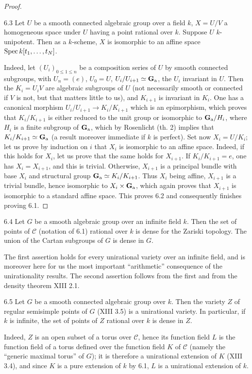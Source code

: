 \begin{proof}
\begin{lemma}{6.3}\label{XIV.6.3}
Let $U$ be a smooth connected
algebraic group over a field
$k$, $X=U/V$ a homogeneous
space under $U$ having a
point rational over $k$.
Suppose $U$ $k$-unipotent.
Then as a $k$-scheme, $X$
is isomorphic to an affine
space $\operatorname{Spec} k[t_1,\ldots,t_N]$.
\end{lemma}
Indeed, let $(U_i)_{0\leq1\leq n}$
be a composition series of
$U$ by smooth connected
subgroups, with $U_n=(e)$,
$U_0=U$, $U_i/U_{i+1}\simeq\mathbf{G}_{\mathrm{a}}$,
the $U_i$ invariant in $U$.
Then the $K_i=U_iV$ are
algebraic subgroups of $U$
(not necessarily smooth
or connected if $V$ is
not, but that matters
little to us), and
$K_{i+1}$ is invariant
in $K_i$. One has a
canonical morphism
$U_i/U_{i+1}\to K_i/K_{i+1}$
which is an epimorphism,
which proves that
$K_i/K_{i+1}$ is either
reduced to the unit group
or isomorphic to
$\mathbf{G}_{\mathrm{a}}/H_i$, where $H_i$
is a finite subgroup of
$\mathbf{G}_{\mathrm{a}}$, which by Rosenlicht
(\loccit th. 2) implies
that $K_i/K_{i+1}\simeq\mathbf{G}_{\mathrm{a}}$
(a result moreover immediate
if $k$ is perfect).
Set now $X_i=U/K_i$;
let us prove by induction
on $i$ that $X_i$ is
isomorphic to an affine
space. Indeed, if this
holds for $X_i$, let
us prove that the same
holds for $X_{i+1}$.
If $K_i/K_{i+1}=e$,
one has $X_i=X_{i+1}$,
and this is trivial.
Otherwise, $X_{i+1}$ is
a principal bundle with
base $X_i$ and structural
group
$\mathbf{G}_{\mathrm{a}}\simeq K_i/K_{i+1}$.
Thus $X_i$ being affine,
$X_{i+1}$ is a trivial
bundle, hence isomorphic
to $X_i\times\mathbf{G}_{\mathrm{a}}$,
which again proves that
$X_{i+1}$ is isomorphic
to a standard affine
space. This proves 6.2
and consequently finishes
proving 6.1.
\end{proof}

\begin{corollary}{6.4}\label{XIV.6.4}
Let $G$ be a smooth
algebraic group over
an infinite field $k$.
Then the set of points
of $\mathscr C$ (notation
of 6.1) rational over
$k$ is dense for the
Zariski topology.
The union of the
Cartan subgroups of
$G$ is dense in $G$.
\end{corollary}
The first assertion
holds for every
unirational variety
over an infinite
field, and is moreover
here for us the most
important ``arithmetic''
consequence of the
unirationality results.
The second assertion
follows from the
first and from the
density theorem XIII 2.1.

\begin{corollary}{6.5}\label{XIV.6.5}
Let $G$ be a smooth
connected algebraic
group over $k$.
Then the variety $Z$
of regular semisimple
points of $G$ (XIII
3.5) is a unirational
variety. In particular,
if $k$ is infinite,
the set of points
of $Z$ rational over
$k$ is dense in $Z$.
\end{corollary}
Indeed, $Z$ is an
open subset of a
torus over
$\mathscr C$, hence
its function field
$L$ is the function
field of a torus
defined over the
function field $K$
of $\mathscr C$
(namely the ``generic
maximal torus'' of
$G$); it is therefore
a unirational extension
of $K$ (XIII 3.4),
and since $K$ is a
pure extension of
$k$ by 6.1, $L$
is a unirational
extension of $k$.

